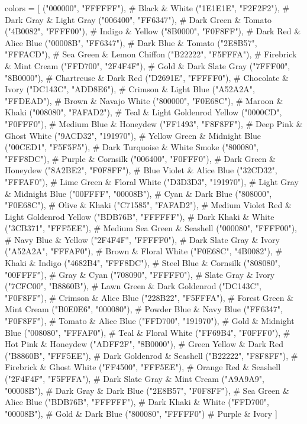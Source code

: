 \begin{pycode}
colors = [
    ("000000", "FFFFFF"),  # Black & White
    ("1E1E1E", "F2F2F2"),  # Dark Gray & Light Gray
    ("006400", "FF6347"),  # Dark Green & Tomato
    ("4B0082", "FFFF00"),  # Indigo & Yellow
    ("8B0000", "F0F8FF"),  # Dark Red & Alice Blue
    ("00008B", "FF6347"),  # Dark Blue & Tomato
    ("2E8B57", "FFFACD"),  # Sea Green & Lemon Chiffon
    ("B22222", "F5FFFA"),  # Firebrick & Mint Cream
    ("FFD700", "2F4F4F"),  # Gold & Dark Slate Gray
    ("7FFF00", "8B0000"),  # Chartreuse & Dark Red
    ("D2691E", "FFFFF0"),  # Chocolate & Ivory
    ("DC143C", "ADD8E6"),  # Crimson & Light Blue
    ("A52A2A", "FFDEAD"),  # Brown & Navajo White
    ("800000", "F0E68C"),  # Maroon & Khaki
    ("008080", "FAFAD2"),  # Teal & Light Goldenrod Yellow
    ("0000CD", "F0FFF0"),  # Medium Blue & Honeydew
    ("FF1493", "F8F8FF"),  # Deep Pink & Ghost White
    ("9ACD32", "191970"),  # Yellow Green & Midnight Blue
    ("00CED1", "F5F5F5"),  # Dark Turquoise & White Smoke
    ("800080", "FFF8DC"),  # Purple & Cornsilk
    ("006400", "F0FFF0"),  # Dark Green & Honeydew
    ("8A2BE2", "F0F8FF"),  # Blue Violet & Alice Blue
    ("32CD32", "FFFAF0"),  # Lime Green & Floral White
    ("D3D3D3", "191970"),  # Light Gray & Midnight Blue
    ("00FFFF", "00008B"),  # Cyan & Dark Blue
    ("808000", "F0E68C"),  # Olive & Khaki
    ("C71585", "FAFAD2"),  # Medium Violet Red & Light Goldenrod Yellow
    ("BDB76B", "FFFFFF"),  # Dark Khaki & White
    ("3CB371", "FFF5EE"),  # Medium Sea Green & Seashell
    ("000080", "FFFF00"),  # Navy Blue & Yellow
    ("2F4F4F", "FFFFF0"),  # Dark Slate Gray & Ivory
    ("A52A2A", "FFFAF0"),  # Brown & Floral White
    ("F0E68C", "4B0082"),  # Khaki & Indigo
    ("4682B4", "FFF8DC"),  # Steel Blue & Cornsilk
    ("808080", "00FFFF"),  # Gray & Cyan
    ("708090", "FFFFF0"),  # Slate Gray & Ivory
    ("7CFC00", "B8860B"),  # Lawn Green & Dark Goldenrod
    ("DC143C", "F0F8FF"),  # Crimson & Alice Blue
    ("228B22", "F5FFFA"),  # Forest Green & Mint Cream
    ("B0E0E6", "000080"),  # Powder Blue & Navy Blue
    ("FF6347", "F0F8FF"),  # Tomato & Alice Blue
    ("FFD700", "191970"),  # Gold & Midnight Blue
    ("008080", "FFFAF0"),  # Teal & Floral White
    ("FF69B4", "F0FFF0"),  # Hot Pink & Honeydew
    ("ADFF2F", "8B0000"),  # Green Yellow & Dark Red
    ("B8860B", "FFF5EE"),  # Dark Goldenrod & Seashell
    ("B22222", "F8F8FF"),  # Firebrick & Ghost White
    ("FF4500", "FFF5EE"),  # Orange Red & Seashell
    ("2F4F4F", "F5FFFA"),  # Dark Slate Gray & Mint Cream
    ("A9A9A9", "00008B"),  # Dark Gray & Dark Blue
    ("2E8B57", "F0F8FF"),  # Sea Green & Alice Blue
    ("BDB76B", "FFFFFF"),  # Dark Khaki & White
    ("FFD700", "00008B"),  # Gold & Dark Blue
    ("800080", "FFFFF0")   # Purple & Ivory
]

\end{pycode}